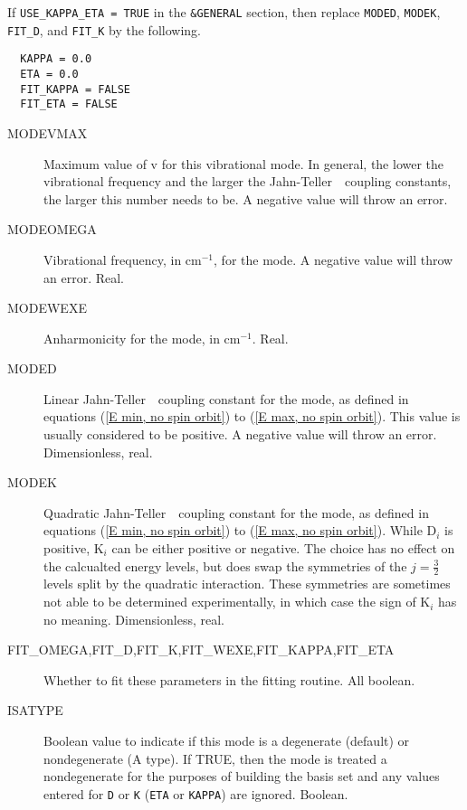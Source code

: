 \documentclass{article}
\newcommand{\wn}{cm$^{-1}$}
\newcommand{\JT}{Jahn-Teller\ }
\begin{document}
If {\tt USE\_KAPPA\_ETA = TRUE} in the {\tt \&GENERAL} section, then replace {\tt MODED}, {\tt MODEK}, {\tt FIT\_D}, and {\tt FIT\_K} by the following.

\begin{verbatim}
  KAPPA = 0.0
  ETA = 0.0
  FIT_KAPPA = FALSE
  FIT_ETA = FALSE
\end{verbatim}

\begin{description}

\item[MODEVMAX] Maximum value of v for this vibrational mode. In
  general, the lower the vibrational frequency and the larger the \JT\
  coupling constants, the larger this number needs to be. A negative value will throw an error.

\item[MODEOMEGA] Vibrational frequency, in \wn , for the mode. A negative value will throw an error. Real.

\item[MODEWEXE] Anharmonicity for the mode, in \wn . Real.

\item[MODED] Linear \JT\ coupling constant for the mode, as defined in
  equations (\ref{E min, no spin orbit}) to (\ref{E max, no spin
    orbit}). This value is usually considered to be positive. A negative value will throw an error. Dimensionless, real.

\item[MODEK] Quadratic \JT\ coupling constant for the mode, as
  defined in equations (\ref{E min, no spin orbit}) to (\ref{E max, no spin
    orbit}). While D$_i$ is positive, K$_i$ can be either positive or
  negative. The choice has no effect on the calcualted energy levels,
  but does swap the symmetries of the $j=\frac{3}{2}$ levels split by
  the quadratic interaction. These symmetries are sometimes not able to be
  determined experimentally, in which case the sign of K$_i$ has
  no meaning. Dimensionless, real.

\item[FIT\_OMEGA,FIT\_D,FIT\_K,FIT\_WEXE,FIT\_KAPPA,FIT\_ETA] Whether to fit these
  parameters in the fitting routine.  All boolean.
  
\item[ISATYPE] Boolean value to indicate if this mode is a degenerate (default) or
  nondegenerate (A type). If TRUE, then the mode is treated a nondegenerate for the purposes
  of building the basis set and any values entered for {\tt D} or {\tt K} ({\tt ETA} or {\tt KAPPA}) are ignored. Boolean.


\end{description}
\end{document}
